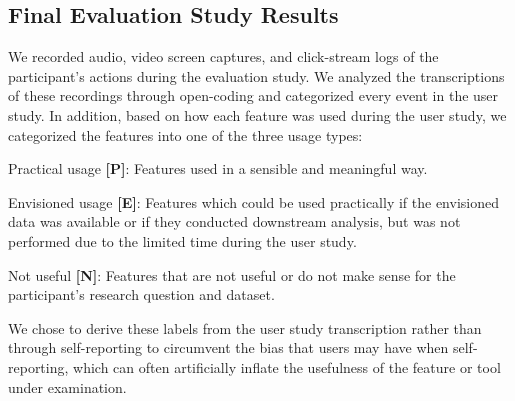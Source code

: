 \subsection{Final Evaluation Study Results\label{eval_findings}}
We recorded audio, video screen captures, and click-stream logs of the participant's actions during the evaluation study. We analyzed the transcriptions of these recordings through open-coding and categorized every event in the user study. In addition, based on how each feature was used during the user study, we categorized the features into one of the three usage types:
\begin{denselist}
    \item Practical usage \textbf{[P]}: Features used in a sensible and meaningful way.
    \item Envisioned usage \textbf{[E]}: Features which could be used practically if the envisioned data was available or if they conducted downstream analysis, but was not performed due to the limited time during the user study. 
    \item Not useful \textbf{[N]}: Features that are not useful or do not make sense for the participant's research question and dataset.
\end{denselist}
We chose to derive these labels from the user study transcription rather than through self-reporting to circumvent the bias that users may have when self-reporting, which can often artificially inflate the usefulness of the feature or tool under examination.
